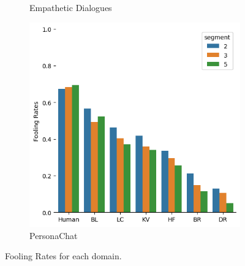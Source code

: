 \documentclass[11pt,a4paper]{article}
\begin{document}
\begin{figure}[h!]
\begin{subfigure}[b]{0.3\textwidth}
    \caption{Empathetic Dialogues}
    \label{fig:2}
  \end{subfigure}
  \begin{subfigure}[b]{0.3\textwidth}
    \includegraphics[width=\textwidth]{figures/personachat/fooling_rates_over_time.png}
    \caption{PersonaChat}
    \label{fig:2}
  \end{subfigure}
  \caption{Fooling Rates for each domain. }
  \label{fig:fooling_rate}
\end{figure}
\end{document}
